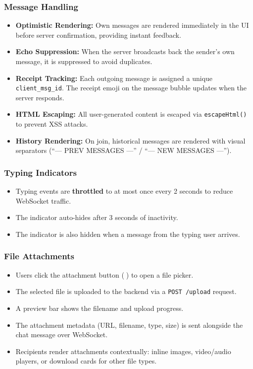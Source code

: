 \documentclass[12pt, a4paper]{article}
\begin{document}
\subsubsection{Message Handling}
\begin{itemize}[leftmargin=*]
    \item \textbf{Optimistic Rendering:} Own messages are rendered immediately in the UI before server confirmation, providing instant feedback.
    \item \textbf{Echo Suppression:} When the server broadcasts back the sender's own message, it is suppressed to avoid duplicates.
    \item \textbf{Receipt Tracking:} Each outgoing message is assigned a unique \texttt{client\_msg\_id}. The receipt emoji on the message bubble updates when the server responds.
    \item \textbf{HTML Escaping:} All user-generated content is escaped via \texttt{escapeHtml()} to prevent XSS attacks.
    \item \textbf{History Rendering:} On join, historical messages are rendered with visual separators (``--- PREV MESSAGES ---'' / ``--- NEW MESSAGES ---'').
\end{itemize}

\subsubsection{Typing Indicators}
\begin{itemize}[leftmargin=*]
    \item Typing events are \textbf{throttled} to at most once every 2 seconds to reduce WebSocket traffic.
    \item The indicator auto-hides after 3 seconds of inactivity.
    \item The indicator is also hidden when a message from the typing user arrives.
\end{itemize}

\subsubsection{File Attachments}
\begin{itemize}[leftmargin=*]
    \item Users click the attachment button (📎) to open a file picker.
    \item The selected file is uploaded to the backend via a \texttt{POST /upload} request.
    \item A preview bar shows the filename and upload progress.
    \item The attachment metadata (URL, filename, type, size) is sent alongside the chat message over WebSocket.
    \item Recipients render attachments contextually: inline images, video/audio players, or download cards for other file types.
\end{itemize}
\end{document}
